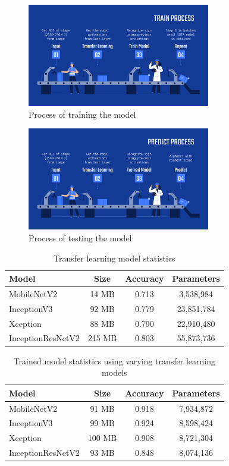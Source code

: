 \documentclass[twocolumn]{article}
\begin{document}
\begin{figure}[h]
\centering
\includegraphics[width=8cm]{./figures/train process}
\caption{Process of training the model}
\end{figure}

\begin{figure}[h]
\centering
\includegraphics[width=8cm]{./figures/predict process}
\caption{Process of testing the model}
\end{figure}

\clearpage

\begin{table}[h]
\begin{tabular}{ |l|c|c|c| }
  \hline
  \textbf{Model} & \textbf{Size} & \textbf{Accuracy} & \textbf{Parameters} \\ \hline
  MobileNetV2 & 14 MB & 0.713 & 3,538,984 \\ \hline
  InceptionV3 & 92 MB & 0.779 & 23,851,784 \\ \hline
  Xception & 88 MB & 0.790 & 22,910,480 \\ \hline
  InceptionResNetV2 & 215 MB & 0.803 & 55,873,736 \\
  \hline
\end{tabular}
\caption{Transfer learning model statistics}
\end{table}

\begin{table}[h]
\begin{tabular}{ |l|c|c|c| }
  \hline
  \textbf{Model} & \textbf{Size} & \textbf{Accuracy} & \textbf{Parameters} \\ \hline
  MobileNetV2 & 91 MB & 0.918 & 7,934,872 \\ \hline
  InceptionV3 & 99 MB & 0.924 & 8,598,424 \\ \hline
  Xception & 100 MB & 0.908 & 8,721,304 \\ \hline
  InceptionResNetV2 & 93 MB & 0.848 & 8,074,136 \\
  \hline
\end{tabular}
\caption{Trained model statistics using varying transfer learning models}
\end{table}
\end{document}
